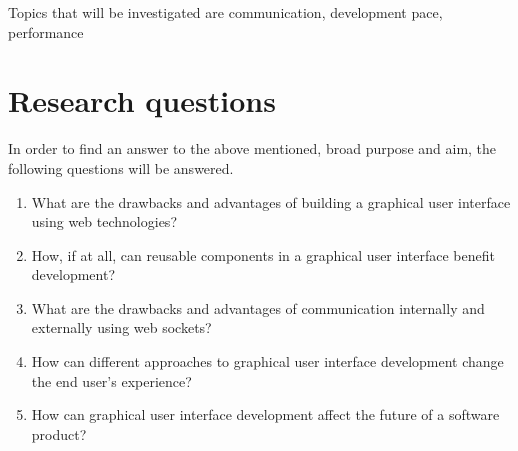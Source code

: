 Topics that will be investigated are communication, development pace, performance



\section{Research questions}
\label{sec:research-questions}



In order to find an answer to the above mentioned, broad purpose and aim, the following questions will be answered.

\begin{enumerate}
  \item What are the drawbacks and advantages of building a graphical user interface using web technologies?
  \item How, if at all, can reusable components in a graphical user interface benefit development?
  \item What are the drawbacks and advantages of communication internally and externally using web sockets?
  \item How can different approaches to graphical user interface development change the end user's experience?
  \item How can graphical user interface development affect the future of a software product?
\end{enumerate}


